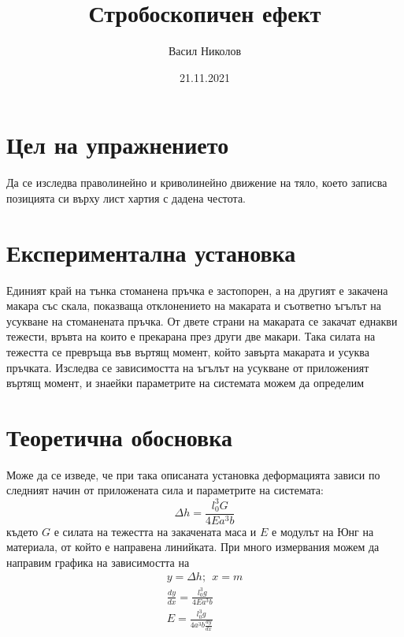 \documentclass[aps, prb, twocolumn, a4paper, floatfix, reprint]{revtex4-2}
\begin{document}
\title{Стробоскопичен ефект}
\author{Васил Николов}
\noaffiliation
\date{21.11.2021}
\maketitle

\section{Цел на упражнението}
Да се изследва праволинейно и криволинейно движение на тяло, което записва позицията си върху лист хартия с дадена честота.

\section{Експериментална установка}
Единият край на тънка стоманена пръчка е застопорен, а на другият е закачена макара със скала, показваща отклонението на макарата и съответно ъгълът на усукване на стоманената пръчка. От двете страни на макарата се закачат еднакви тежести, връвта на които е прекарана през други две макари. Така силата на тежестта се превръща във въртящ момент, който завърта макарата и усуква пръчката. Изследва се зависимостта на ъгълът на усукване от приложеният въртящ момент, и знаейки параметрите на системата можем да определим 

\section{Теоретична обосновка}
Може да се изведе, че при така описаната установка деформацията зависи по следният начин от приложената сила и параметрите на системата:
\begin{equation} \label{eq:1}
    \Delta h=\frac{l_0^3 G}{4E a^3 b}
\end{equation}
където $G$ е силата на тежестта на закачената маса и $E$ е модулът на Юнг на материала, от който е направена линийката. При много измервания можем да направим графика на зависимостта на 
\begin{gather*} \label{eq:2}
    y=\Delta h; \ \ x = m \\
    \frac{dy}{dx} = \frac{l_0^3 g}{4E a^3 b} \\
    E = \frac{l_0^3 g}{4a^3 b \frac{dy}{dx}} \tag{2}
\end{gather*}
\end{document}
